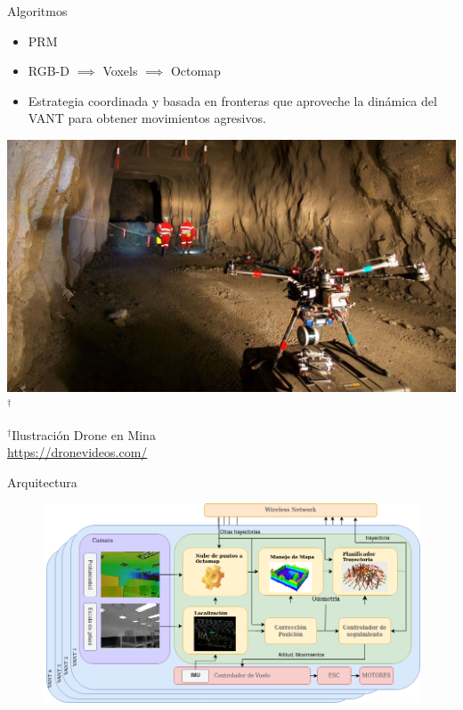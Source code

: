 \documentclass[
  24pt, %
  aspectratio=169, %
]{beamer}
\begin{document}
\begin{frame}{Algoritmos}
  
  \begin{minipage}{0.47\textwidth}
    
    \begin{itemize}
    \item \small PRM 
    \item \small RGB-D $\implies$ Voxels $\implies$ Octomap
    \item \small Estrategia coordinada y basada en fronteras que aproveche la dinámica del VANT para obtener movimientos agresivos.
    \end{itemize}
  \end{minipage}
  \hspace{0.1cm}
  \begin{minipage}{0.5\textwidth}
    \includegraphics[width=\textwidth]{maxresdefault.jpg}$^\dag$\\
    \rule{0in}{1.2em}$^\dag$\scriptsize Ilustración Drone en Mina \\
    \tiny \url{https://dronevideos.com/} 
  \end{minipage}
  
\end{frame}

\begin{frame}{Arquitectura}
  \begin{figure}
    \centering
    \includegraphics[width=15cm]{arquitectura}
  \end{figure}
\end{frame}
\end{document}
